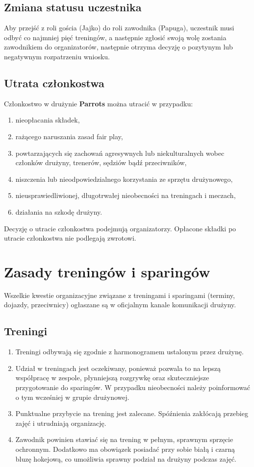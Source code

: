 \documentclass[12pt,a4paper]{article}
\let\stdsection\section
\renewcommand\section{\clearpage\stdsection}
\begin{document}
\subsection{Zmiana statusu uczestnika}
Aby przejść z roli gościa (Jajko) do roli zawodnika (Papuga), uczestnik musi odbyć co najmniej pięć treningów, a następnie zgłosić swoją wolę zostania zawodnikiem do organizatorów, następnie otrzyma decyzję o pozytynym lub negatywnym rozpatrzeniu wniosku.

\subsection{Utrata członkostwa}
Członkostwo w drużynie \textbf{Parrots} można utracić w przypadku:
\begin{enumerate}
    \item nieopłacania składek,
    \item rażącego naruszania zasad fair play,
    \item powtarzających się zachowań agresywnych lub niekulturalnych wobec członków drużyny, trenerów, sędziów bądź przeciwników,
    \item niszczenia lub nieodpowiedzialnego korzystania ze sprzętu drużynowego,
    \item nieusprawiedliwionej, długotrwałej nieobecności na treningach i meczach,
    \item działania na szkodę drużyny.
\end{enumerate}
Decyzję o utracie członkostwa podejmują organizatorzy. Opłacone składki po utracie członkostwa nie podlegają zwrotowi.

\section{Zasady treningów i sparingów}
Wszelkie kwestie organizacyjne związane z treningami i sparingami (terminy, dojazdy, przeciwnicy) ogłaszane są w oficjalnym kanale komunikacji drużyny.

\subsection{Treningi}
\begin{enumerate}
  \item Treningi odbywają się zgodnie z harmonogramem ustalonym przez drużynę.
  \item Udział w treningach jest oczekiwany, ponieważ pozwala to na lepszą współpracę w zespole, płynniejszą rozgrywkę oraz skuteczniejsze przygotowanie do sparingów. W przypadku nieobecności należy poinformować o tym wcześniej w grupie drużynowej.
  \item Punktualne przybycie na trening jest zalecane. Spóźnienia zakłócają przebieg zajęć i utrudniają organizację.
  \item Zawodnik powinien stawiać się na trening w pełnym, sprawnym sprzęcie ochronnym. Dodatkowo ma obowiązek posiadać przy sobie białą i czarną bluzę hokejową, co umożliwia sprawny podział na drużyny podczas zajęć.

\end{enumerate}
\end{document}

